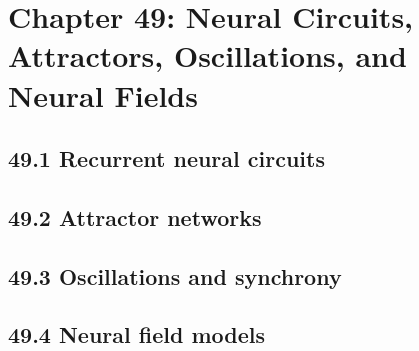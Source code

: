 \section{Chapter 49: Neural Circuits, Attractors, Oscillations, and Neural Fields}

\subsection{49.1 Recurrent neural circuits}

\subsection{49.2 Attractor networks}

\subsection{49.3 Oscillations and synchrony}

\subsection{49.4 Neural field models}

\clearpage
